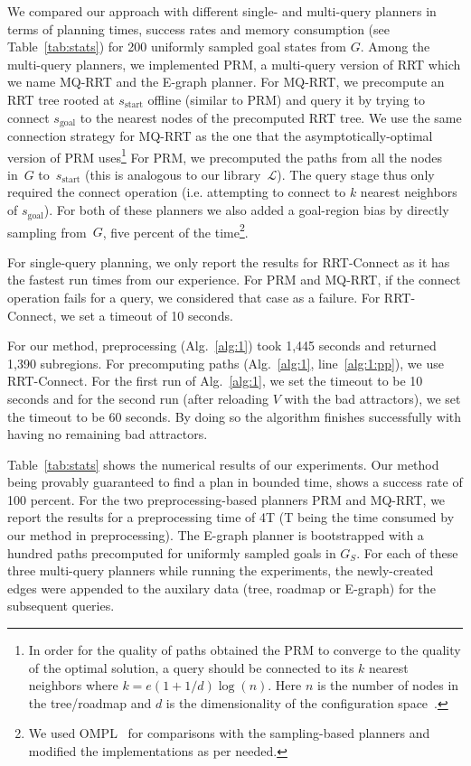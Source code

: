 \documentclass[letterpaper]{article} %
\newcommand{\calL}{\ensuremath{\mathcal{L}}\xspace}
\newcommand{\sStart}{\ensuremath{s_{\text{start}}\xspace}}
\newcommand{\sGoal}{\ensuremath{s_{\text{goal}}\xspace}}
\begin{document}
We compared our approach with different single- and multi-query planners in terms of planning times, success rates and memory consumption (see Table~\ref{tab:stats}) for 200 uniformly sampled goal states from $G$. Among the multi-query planners, we implemented \textsf{PRM}, a multi-query version of \textsf{RRT} which we name \textsf{MQ-RRT} and the E-graph planner. 
For \textsf{MQ-RRT}, we precompute an \textsf{RRT} tree rooted at  $\sStart$ offline (similar to \textsf{PRM}) and query it by trying to connect $\sGoal$ to the nearest nodes of the precomputed RRT tree. We use the same connection strategy for MQ-RRT as the one that the asymptotically-optimal version of \textsf{PRM} uses\footnote{In order for the quality of paths obtained the \textsf{PRM} to converge to the quality of the optimal solution, a query should be connected to its $k$ nearest neighbors where 
$k = e(1+1/d)\log(n)$.
Here $n$ is the number of nodes in the tree/roadmap and $d$ is the dimensionality of the configuration space~\cite{karaman2011sampling,SSH16}. 
}
For \textsf{PRM}, we precomputed the paths from all the nodes in~$G$ to~$s_{\text{start}}$ (this is analogous to our library~$\calL$). 
The query stage thus only required the connect operation (i.e. attempting to connect to $k$ nearest neighbors of $\sGoal$). For both of these planners we also added a goal-region bias by directly sampling from~$G$, five percent of the time\footnote{We used OMPL~\cite{SMK12} for comparisons with the sampling-based planners and modified the implementations as per needed.}. 

For single-query planning, we only report the results for \textsf{RRT}-Connect as it has the fastest run times from our experience. For \textsf{PRM} and \textsf{MQ-RRT}, if the connect operation fails for a query, we considered that case as a failure. For \textsf{RRT}-Connect, we set a timeout of 10 seconds.

For our method, preprocessing (Alg.~\ref{alg:1}) took 1,445 seconds and returned 1,390 subregions. For precomputing paths (Alg.~\ref{alg:1}, line~\ref{alg:1:pp}), we use \textsf{RRT}-Connect. For the first run of Alg.~\ref{alg:1}, we set the timeout to be 10 seconds and for the second run (after reloading $V$ with the bad attractors), we set the timeout to be 60 seconds. By doing so the algorithm finishes successfully with having no remaining bad attractors.

Table~\ref{tab:stats} shows the numerical results of our experiments. Our method being provably guaranteed to find a plan in bounded time, shows a success rate of 100 percent. For the two preprocessing-based planners PRM and MQ-RRT, we report the results for a preprocessing time of 4T (T being the time consumed by our method in preprocessing). The E-graph planner is bootstrapped with a hundred paths precomputed for uniformly sampled goals in $G_S$. For each of these three multi-query planners while running the experiments, the newly-created edges were appended to the auxilary data (tree, roadmap or E-graph) for the subsequent queries.
\end{document}
